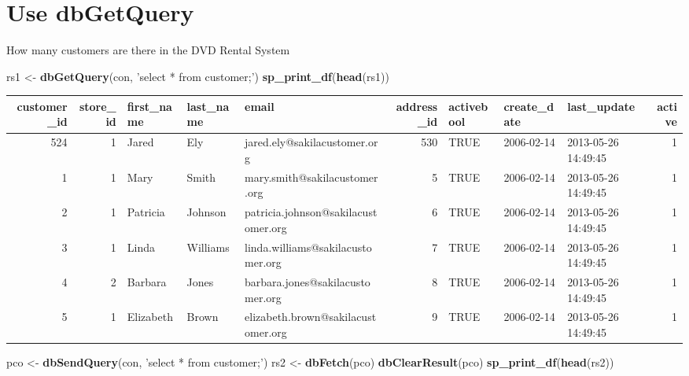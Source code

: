 \documentclass[]{book}
\newenvironment{Shaded}{\begin{snugshade}}{\end{snugshade}}
\newcommand{\KeywordTok}[1]{\textcolor[rgb]{0.13,0.29,0.53}{\textbf{#1}}}
\newcommand{\NormalTok}[1]{#1}
\newcommand{\StringTok}[1]{\textcolor[rgb]{0.31,0.60,0.02}{#1}}
\theoremstyle{definition}
\theoremstyle{definition}
\theoremstyle{definition}
\theoremstyle{remark}
\begin{document}
\hypertarget{use-dbgetquery}{%
\chapter{Use dbGetQuery}\label{use-dbgetquery}}

How many customers are there in the DVD Rental System

\begin{Shaded}
\begin{Highlighting}[]
\NormalTok{rs1 <-}\StringTok{ }\KeywordTok{dbGetQuery}\NormalTok{(con, }\StringTok{'select * from customer;'}\NormalTok{)}
\KeywordTok{sp_print_df}\NormalTok{(}\KeywordTok{head}\NormalTok{(rs1))}
\end{Highlighting}
\end{Shaded}

\begin{tabular}{r|r|l|l|l|r|l|l|l|r}
\hline
customer\_id & store\_id & first\_name & last\_name & email & address\_id & activebool & create\_date & last\_update & active\\
\hline
524 & 1 & Jared & Ely & jared.ely@sakilacustomer.org & 530 & TRUE & 2006-02-14 & 2013-05-26 14:49:45 & 1\\
\hline
1 & 1 & Mary & Smith & mary.smith@sakilacustomer.org & 5 & TRUE & 2006-02-14 & 2013-05-26 14:49:45 & 1\\
\hline
2 & 1 & Patricia & Johnson & patricia.johnson@sakilacustomer.org & 6 & TRUE & 2006-02-14 & 2013-05-26 14:49:45 & 1\\
\hline
3 & 1 & Linda & Williams & linda.williams@sakilacustomer.org & 7 & TRUE & 2006-02-14 & 2013-05-26 14:49:45 & 1\\
\hline
4 & 2 & Barbara & Jones & barbara.jones@sakilacustomer.org & 8 & TRUE & 2006-02-14 & 2013-05-26 14:49:45 & 1\\
\hline
5 & 1 & Elizabeth & Brown & elizabeth.brown@sakilacustomer.org & 9 & TRUE & 2006-02-14 & 2013-05-26 14:49:45 & 1\\
\hline
\end{tabular}

\begin{Shaded}
\begin{Highlighting}[]
\NormalTok{pco <-}\StringTok{ }\KeywordTok{dbSendQuery}\NormalTok{(con, }\StringTok{'select * from customer;'}\NormalTok{)}
\NormalTok{rs2  <-}\StringTok{ }\KeywordTok{dbFetch}\NormalTok{(pco)}
\KeywordTok{dbClearResult}\NormalTok{(pco)}
\KeywordTok{sp_print_df}\NormalTok{(}\KeywordTok{head}\NormalTok{(rs2))}
\end{Highlighting}
\end{Shaded}
\end{document}
